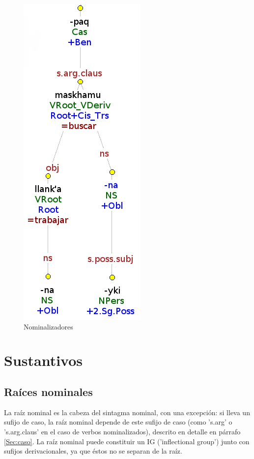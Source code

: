\documentclass[a4paper,11pt,DIV12]{scrartcl}
\begin{document}
\begin{figure}
{\begin{minipage}{0.5\textwidth}
   \includegraphics[scale=0.5]{tred12.png}
\end{minipage}}
\caption{Nominalizadores}\label{Fig:NS}
\end{figure}



\section{Sustantivos}
   \subsection{Ra\'ices nominales}\label{Sec:nomroot}
    La ra\'iz nominal es la cabeza del sintagma nominal, con una excepci\'on: si lleva un sufijo de caso, la ra\'iz nominal depende de este sufijo de caso (como 's.arg' o 's.arg.claus' en el caso de verbos nominalizados), descrito en detalle en p\'arrafo \ref{Sec:caso}.
 La ra\'iz nominal puede constituir un IG ('inflectional group') junto con sufijos derivacionales, ya que \'estos no se separan de la ra\'iz.
\end{document}
